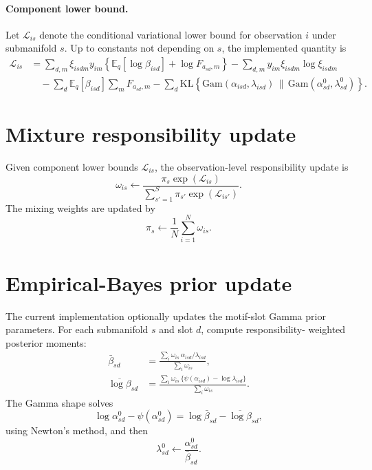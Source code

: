 \documentclass[11pt]{article}
\newcommand{\Gam}{\mathrm{Gam}}
\newcommand{\KL}{\mathrm{KL}}
\newcommand{\E}{\mathbb{E}}
\theoremstyle{definition}
\begin{document}
\paragraph{Component lower bound.}
Let $\mathcal{L}_{is}$ denote the conditional variational lower bound for
observation $i$ under submanifold $s$. Up to constants not depending on $s$,
the implemented quantity is
\begin{align}
  \mathcal{L}_{is}
  &=
  \sum_{d,m} \xi_{isdm} y_{im}
    \left\{\E_q[\log \beta_{isd}] + \log F_{a_{sd},m}\right\}
  - \sum_{d,m} y_{im}\xi_{isdm}\log \xi_{isdm} \nonumber \\
  &\quad
  - \sum_d \E_q[\beta_{isd}] \sum_m F_{a_{sd},m}
  - \sum_d \KL\left\{
      \Gam(\alpha_{isd},\lambda_{isd})
      \,\|\, \Gam(\alpha^0_{sd},\lambda^0_{sd})
    \right\}.
\end{align}

\section{Mixture responsibility update}

Given component lower bounds $\mathcal{L}_{is}$, the observation-level
responsibility update is
\[
  \omega_{is}
  \leftarrow
  \frac{\pi_s \exp(\mathcal{L}_{is})}
       {\sum_{s'=1}^{S} \pi_{s'} \exp(\mathcal{L}_{is'})}.
\]
The mixing weights are updated by
\[
  \pi_s \leftarrow \frac{1}{N}\sum_{i=1}^{N}\omega_{is}.
\]

\section{Empirical-Bayes prior update}

The current implementation optionally updates the motif-slot Gamma prior
parameters. For each submanifold $s$ and slot $d$, compute responsibility-
weighted posterior moments:
\begin{align}
  \bar{\beta}_{sd}
    &= \frac{\sum_i \omega_{is}\,\alpha_{isd}/\lambda_{isd}}
            {\sum_i \omega_{is}}, \\
  \overline{\log \beta}_{sd}
    &= \frac{\sum_i \omega_{is}\,
        \{\psi(\alpha_{isd})-\log\lambda_{isd}\}}
            {\sum_i \omega_{is}}.
\end{align}
The Gamma shape solves
\[
  \log \alpha^0_{sd} - \psi(\alpha^0_{sd})
  =
  \log \bar{\beta}_{sd} - \overline{\log \beta}_{sd},
\]
using Newton's method, and then
\[
  \lambda^0_{sd} \leftarrow \frac{\alpha^0_{sd}}{\bar{\beta}_{sd}}.
\]
\end{document}
